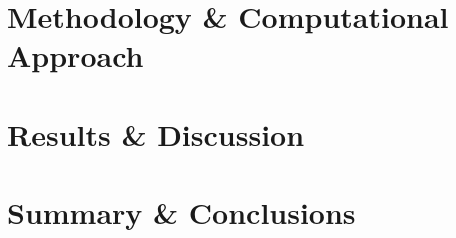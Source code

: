 \documentclass[12pt, oneside]{book}
\begin{document}
 
%  

 
 
% 


\part{Methodology \& Computational Approach}\label{part:method}




\part{Results \& Discussion}\label{part:results}




\part{Summary \& Conclusions}\label{part:summary}


\end{document}
